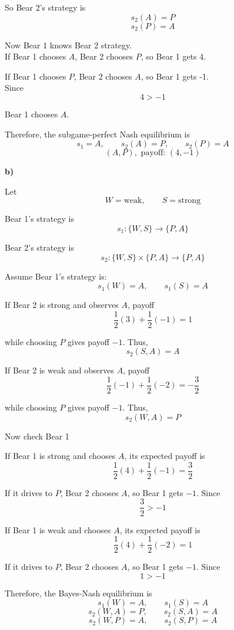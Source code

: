 \documentclass[11pt]{article}
\begin{document}
So Bear 2's strategy is
\[
s_2(A)=P
\]
\[
s_2(P)=A
\]

Now Bear 1 knows Bear 2 strategy.\\

If Bear 1 chooses \(A\), Bear 2 chooses \(P\), so Bear 1 gets 4.

If Bear 1 chooses \(P\), Bear 2 chooses \(A\), so Bear 1 gets -1.\\

Since
\[
4>-1
\]

Bear 1 chooses \(A\).

Therefore, the subgame-perfect Nash equilibrium is
\[
s_1=A,\qquad s_2(A)=P,\qquad s_2(P)=A
\]
\[
(A,P), \text{ payoff: } (4, -1)
\]

\textbf{b)}

Let
\[
W=\text{weak},\qquad S=\text{strong}
\]

Bear 1's strategy is
\[
s_1:\{W,S\}\to\{P,A\}
\]

Bear 2's strategy is
\[
s_2:\{W,S\}\times\{P,A\}\to\{P,A\}
\]

Assume Bear 1's strategy is:
\[
s_1(W)=A,\qquad s_1(S)=A
\]

If Bear 2 is strong and observes \(A\), payoff
\[
\frac12(3)+\frac12(-1)=1
\]

while choosing \(P\) gives payoff \(-1\). Thus,
\[
s_2(S,A)=A
\]

If Bear 2 is weak and observes \(A\), payoff
\[
\frac12(-1)+\frac12(-2)=-\frac32
\]

while choosing \(P\) gives payoff \(-1\). Thus,
\[
s_2(W,A)=P
\]

Now check Bear 1

If Bear 1 is strong and chooses \(A\), its expected payoff is
\[
\frac12(4)+\frac12(-1)=\frac32
\]

If it drives to \(P\), Bear 2 chooses \(A\), so Bear 1 gets \(-1\). Since
\[
\frac32>-1
\]

If Bear 1 is weak and chooses \(A\), its expected payoff is
\[
\frac12(4)+\frac12(-2)=1
\]

If it drives to \(P\), Bear 2 chooses \(A\), so Bear 1 gets \(-1\). Since
\[
1>-1
\]

Therefore, the Bayes-Nash equilibrium is
\[
s_1(W)=A,\qquad s_1(S)=A
\]
\[
s_2(W,A)=P,\qquad s_2(S,A)=A
\]
\[
s_2(W,P)=A,\qquad s_2(S,P)=A
\]
\end{document}
